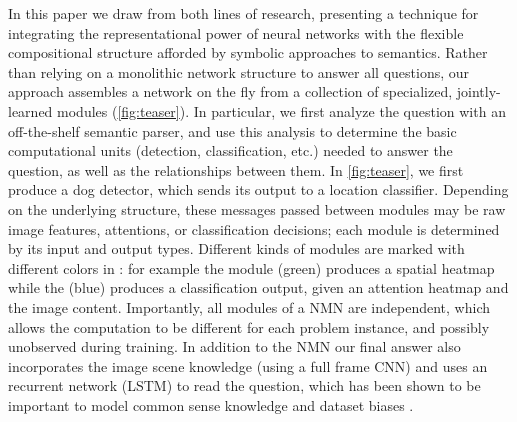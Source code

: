 In this paper we draw from both lines of research, presenting a technique for
integrating the representational power of neural networks with the flexible
compositional structure afforded by symbolic approaches to semantics.  Rather
than relying on a monolithic network structure to answer all questions, our
approach assembles a network on the fly from a collection of specialized,
jointly-learned modules (\autoref{fig:teaser}). In particular, we first analyze
the question with an off-the-shelf semantic parser, and use this analysis to
determine the basic computational units (detection, classification, etc.) needed
to answer the question, as well as the relationships between them. In
\autoref{fig:teaser}, we first produce a dog detector, which sends its output to
a location classifier. Depending on the underlying structure, these messages
passed between modules may be raw image features, attentions, or classification
decisions; each module is determined by its input and output types.
Different kinds of modules are marked with different
colors in : for example the  module
(green) produces a spatial heatmap while the  (blue)
produces a classification output, given an attention heatmap and the image
content. Importantly, all modules of a NMN are independent, which allows the
computation to be different for each problem instance, and possibly unobserved
during training. 
In addition to the NMN our final answer also incorporates the image scene
knowledge (using a full frame CNN) and uses an  recurrent network (LSTM) to read
the question, which has been shown to be important to model common sense
knowledge and dataset biases \cite{malinowski15iccv}.






